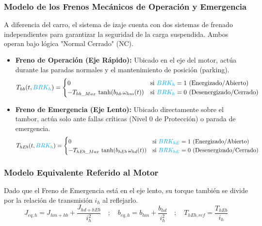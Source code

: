 \documentclass[11pt]{article}                                    %
\begin{document}
\subsubsection*{Modelo de los Frenos Mecánicos de Operación y Emergencia}
A diferencia del carro, el sistema de izaje cuenta con dos sistemas de frenado independientes para garantizar la seguridad de la carga suspendida. Ambos operan bajo lógica "Normal Cerrado" (NC).
\begin{itemize}
    \item \textbf{Freno de Operación (Eje Rápido):} Ubicado en el eje del motor, actúa durante las paradas normales y el mantenimiento de posición (parking).
    \begin{equation} \label{eq:brake_hoist_op}
        T_{hb}(t,\textcolor{cyan}{BRK_{h}}) = 
        \begin{cases} 
            0 & \text{si } \textcolor{cyan}{BRK_h} = 1 \text{ (Energizado/Abierto)} \\
            -T_{hb\_Max} \, \tanh(b_{hb} \, \omega_{hm}(t)) & \text{si } \textcolor{cyan}{BRK_h} = 0 \text{ (Desenergizado/Cerrado)}
        \end{cases}
    \end{equation}
    \item \textbf{Freno de Emergencia (Eje Lento):} Ubicado directamente sobre el tambor, actúa solo ante fallas críticas (Nivel 0 de Protección) o parada de emergencia.
    \begin{equation} \label{eq:brake_hoist_emg}
        T_{hEb}(t,\textcolor{cyan}{BRK_{h}}) = 
        \begin{cases} 
            0 & \text{si } \textcolor{cyan}{BRK_{hE}} = 1 \text{ (Energizado/Abierto)} \\
            -T_{hEb\_Max} \, \tanh(b_{hEb} \, \omega_{hd}(t)) & \text{si } \textcolor{cyan}{BRK_{hE}} = 0 \text{ (Desenergizado/Cerrado)}
        \end{cases}
    \end{equation}
\end{itemize}

\subsubsection*{Modelo Equivalente Referido al Motor}
Dado que el Freno de Emergencia está en el eje lento, su torque también se divide por la relación de transmisión $i_h$ al reflejarlo.
\begin{equation}
    J_{eq,h} = J_{hm+hb} + \frac{J_{hd+hEb}}{i_h^2}  \quad ; \quad
    b_{eq,h} = b_{hm} + \frac{b_{hd}}{i_h^2}  \quad ; \quad
    T_{hEb,ref} = \frac{T_{hEb}}{i_h}
\end{equation}
\end{document}
